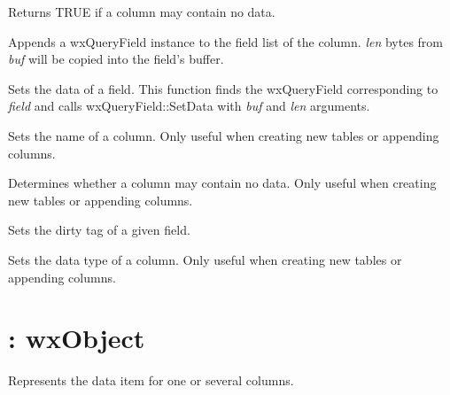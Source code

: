 
  
Returns TRUE if a column may contain no data.



Appends a wxQueryField instance to the field list of the column. {\it len} bytes from\rtfsp
{\it buf} will be copied into the field's buffer.



Sets the data of a field. This function finds the wxQueryField corresponding to\rtfsp
{\it field} and calls wxQueryField::SetData with {\it buf} and {\it len} arguments.



Sets the name of a column. Only useful when creating new tables or
appending columns.
 


Determines whether a column may contain no data. Only useful when creating new tables or
appending columns.



Sets the dirty tag of a given field.


  
Sets the data type of a column. Only useful when creating new tables or
appending columns.

\section{: wxObject}\label{wxqueryfield}


Represents the data item for one or several columns.

